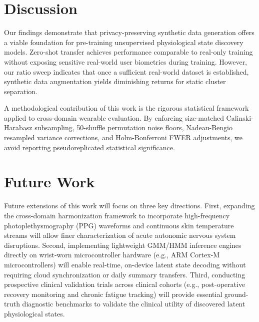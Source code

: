 \documentclass[conference]{IEEEtran}
\begin{document}
\section{Discussion}
Our findings demonstrate that privacy-preserving synthetic data generation offers a viable foundation for pre-training unsupervised physiological state discovery models. Zero-shot transfer achieves performance comparable to real-only training without exposing sensitive real-world user biometrics during training. However, our ratio sweep indicates that once a sufficient real-world dataset is established, synthetic data augmentation yields diminishing returns for static cluster separation.

A methodological contribution of this work is the rigorous statistical framework applied to cross-domain wearable evaluation. By enforcing size-matched Calinski-Harabasz subsampling, 50-shuffle permutation noise floors, Nadeau-Bengio resampled variance corrections, and Holm-Bonferroni FWER adjustments, we avoid reporting pseudoreplicated statistical significance.

\section{Future Work}
Future extensions of this work will focus on three key directions. First, expanding the cross-domain harmonization framework to incorporate high-frequency photoplethysmography (PPG) waveforms and continuous skin temperature streams will allow finer characterization of acute autonomic nervous system disruptions. Second, implementing lightweight GMM/HMM inference engines directly on wrist-worn microcontroller hardware (e.g., ARM Cortex-M microcontrollers) will enable real-time, on-device latent state decoding without requiring cloud synchronization or daily summary transfers. Third, conducting prospective clinical validation trials across clinical cohorts (e.g., post-operative recovery monitoring and chronic fatigue tracking) will provide essential ground-truth diagnostic benchmarks to validate the clinical utility of discovered latent physiological states.
\end{document}
